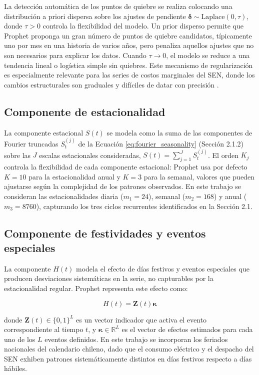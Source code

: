 La detección automática de los puntos de quiebre se realiza colocando una distribución a priori dispersa sobre los ajustes de pendiente $\boldsymbol{\delta} \sim \text{Laplace}(0, \tau)$, donde $\tau > 0$ controla la flexibilidad del modelo. Un prior disperso permite que Prophet proponga un gran número de puntos de quiebre candidatos, típicamente uno por mes en una historia de varios años, pero penaliza aquellos ajustes que no son necesarios para explicar los datos. Cuando $\tau \to 0$, el modelo se reduce a una tendencia lineal o logística simple sin quiebres. Este mecanismo de regularización es especialmente relevante para las series de costos marginales del SEN, donde los cambios estructurales son graduales y difíciles de datar con precisión \cite{Prophet}.

\subsection{Componente de estacionalidad}

La componente estacional $S(t)$ se modela como la suma de las componentes de Fourier truncadas $S_t^{(j)}$ de la Ecuación \eqref{eq:fourier_seasonality} (Sección 2.1.2) sobre las $J$ escalas estacionales consideradas, $S(t) = \sum_{j=1}^{J} S_t^{(j)}$. El orden $K_j$ controla la flexibilidad de cada componente estacional: Prophet usa por defecto $K=10$ para la estacionalidad anual y $K=3$ para la semanal, valores que pueden ajustarse según la complejidad de los patrones observados. En este trabajo se consideran las estacionalidades diaria ($m_1 = 24$), semanal ($m_2 = 168$) y anual ($m_3 = 8760$), capturando los tres ciclos recurrentes identificados en la Sección 2.1.

\subsection{Componente de festividades y eventos especiales}

La componente $H(t)$ modela el efecto de días festivos y eventos especiales que producen desviaciones sistemáticas en la serie, no capturables por la estacionalidad regular. Prophet representa este efecto como:

\begin{equation}
H(t) = \mathbf{Z}(t)\boldsymbol{\kappa}
\end{equation}

donde $\mathbf{Z}(t) \in \{0,1\}^{L}$ es un vector indicador que activa el evento correspondiente al tiempo $t$, y $\boldsymbol{\kappa} \in \mathbb{R}^{L}$ es el vector de efectos estimados para cada uno de los $L$ eventos definidos. En este trabajo se incorporan los feriados nacionales del calendario chileno, dado que el consumo eléctrico y el despacho del SEN exhiben patrones sistemáticamente distintos en días festivos respecto a días hábiles.

